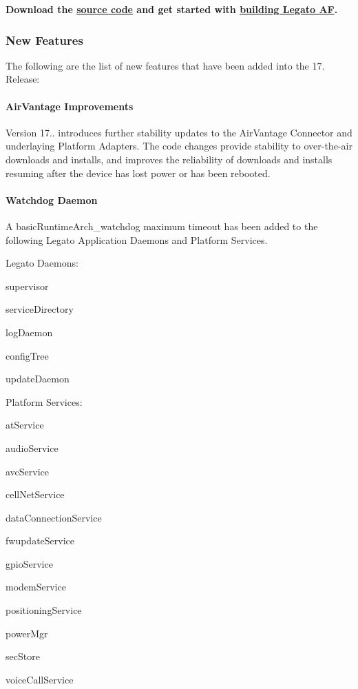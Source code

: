 {\bfseries  Download the \hyperlink{aboutReleaseInfo}{source code} and get started with \hyperlink{basicBuild}{building Legato AF}. }\hypertarget{releaseNotes17100_rn1710_Features}{}\subsubsection{New Features}\label{releaseNotes17100_rn1710_Features}
The following are the list of new features that have been added into the 17. Release\+:\hypertarget{releaseNotes17100_rn1710_Features_AV}{}\paragraph{Air\+Vantage Improvements}\label{releaseNotes17100_rn1710_Features_AV}
Version 17.. introduces further stability updates to the Air\+Vantage Connector and underlaying Platform Adapters. The code changes provide stability to over-\/the-\/air downloads and installs, and improves the reliability of downloads and installs resuming after the device has lost power or has been rebooted.\hypertarget{releaseNotes17100_rn1710_Features_SIM}{}\paragraph{Watchdog Daemon}\label{releaseNotes17100_rn1710_Features_SIM}
A basic\+Runtime\+Arch\+\_\+watchdog maximum timeout has been added to the following Legato Application Daemons and Platform Services.

Legato Daemons\+:
\begin{DoxyItemize}
\item supervisor
\item service\+Directory
\item log\+Daemon
\item config\+Tree
\item update\+Daemon
\end{DoxyItemize}

Platform Services\+:
\begin{DoxyItemize}
\item at\+Service
\item audio\+Service
\item avc\+Service
\item cell\+Net\+Service
\item data\+Connection\+Service
\item fwupdate\+Service
\item gpio\+Service
\item modem\+Service
\item positioning\+Service
\item power\+Mgr
\item sec\+Store
\item voice\+Call\+Service
\end{DoxyItemize}

